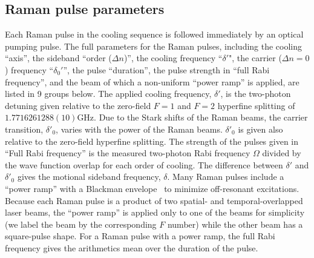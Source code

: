\documentclass[aps,secnumarabic,amsmath,amssymb]{revtex4}
\begin{document}
\subsection{Raman pulse parameters}
Each Raman pulse in the cooling sequence is followed immediately by an optical pumping
pulse.
The full parameters for the Raman pulses, including the cooling ``axis'', the sideband ``order ($\Delta n$)'', the cooling frequency ``$\delta '$", the carrier ($\Delta n=0$) frequency ``$\delta_0'$'', the pulse ``duration'', the pulse strength in ``full Rabi frequency'', and the beam of which a non-uniform ``power ramp'' is applied,   are listed in 9 groups below.
The applied cooling frequency, $\delta'$,  is the two-photon detuning given relative to the zero-field $F=1$ and $F=2$ hyperfine splitting
of $1.7716261288(10)$GHz\cite{SteckNa}.
Due to the Stark shifts of the Raman beams, the carrier transition, $\delta'_0$, varies with the power of the Raman beams. $\delta'_0$ is given also relative to the zero-field hyperfine splitting.
The strength of the pulses given in ``Full Rabi frequency'' is the measured two-photon Rabi frequency $\Omega$ divided by the wave function overlap for each order of cooling. The difference between $\delta'$ and $\delta'_0$ gives the motional sideband frequency, $\delta$.
Many Raman pulses include a ``power ramp'' with a Blackman envelope~\cite{Kasevich1992} to minimize off-resonant excitations.
Because each Raman pulse is a product of two spatial- and temporal-overlapped laser beams, the ``power ramp'' is applied only to one of the beams for simplicity (we label the beam by the corresponding $F$ number) while the other beam has a square-pulse shape.
For a Raman pulse with a power ramp,
the full Rabi frequency gives the arithmetics mean over the duration of the pulse.

\newpage
\end{document}
